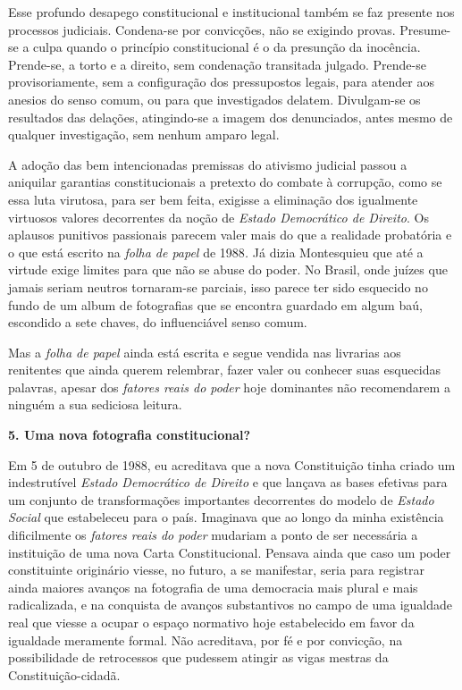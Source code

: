 Esse profundo desapego constitucional e institucional também se faz
presente nos processos judiciais. Condena-se por convicções, não se
exigindo provas. Presume-se a culpa quando o princípio constitucional é
o da presunção da inocência. Prende-se, a torto e a direito, sem
condenação transitada julgado. Prende-se provisoriamente, sem a
configuração dos pressupostos legais, para atender aos anesios do senso
comum, ou para que investigados delatem. Divulgam-se os resultados das
delações, atingindo-se a imagem dos denunciados, antes mesmo de qualquer
investigação, sem nenhum amparo legal.

A adoção das bem intencionadas premissas do ativismo judicial passou a
aniquilar garantias constitucionais a pretexto do combate à corrupção,
como se essa luta virutosa, para ser bem feita, exigisse a eliminação
dos igualmente virtuosos valores decorrentes da noção de \emph{Estado
Democrático de Direito}. Os aplausos punitivos passionais parecem valer
mais do que a realidade probatória e o que está escrito na \emph{folha
de papel} de 1988\emph{.} Já dizia Montesquieu que até a virtude exige
limites para que não se abuse do poder. No Brasil, onde juízes que
jamais seriam neutros tornaram-se parciais, isso parece ter sido
esquecido no fundo de um album de fotografias que se encontra guardado
em algum baú, escondido a sete chaves, do influenciável senso comum.

Mas a \emph{folha de papel} ainda está escrita e segue vendida nas
livrarias aos renitentes que ainda querem relembrar, fazer valer ou
conhecer suas esquecidas palavras, apesar dos \emph{fatores reais do
poder} hoje dominantes não recomendarem a ninguém a sua sediciosa
leitura.

\textbf{5. Uma nova fotografia constitucional?}

Em 5 de outubro de 1988, eu acreditava que a nova Constituição tinha
criado um indestrutível \emph{Estado Democrático de Direito} e que
lançava as bases efetivas para um conjunto de transformações importantes
decorrentes do modelo de \emph{Estado Social} que estabeleceu para o
país. Imaginava que ao longo da minha existência dificilmente os
\emph{fatores reais do poder} mudariam a ponto de ser necessária a
instituição de uma nova Carta Constitucional. Pensava ainda que caso um
poder constituinte originário viesse, no futuro, a se manifestar, seria
para registrar ainda maiores avanços na fotografia de uma democracia
mais plural e mais radicalizada, e na conquista de avanços substantivos
no campo de uma igualdade real que viesse a ocupar o espaço normativo
hoje estabelecido em favor da igualdade meramente formal. Não
acreditava, por fé e por convicção, na possibilidade de retrocessos que
pudessem atingir as vigas mestras da Constituição-cidadã.

